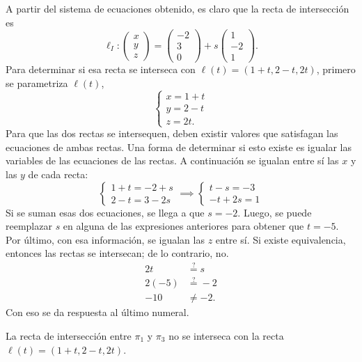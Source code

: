 \documentclass{fmbvecto}
\begin{document}
\begin{problema}
A partir del sistema de ecuaciones obtenido, es claro que la recta de intersección es
\[\ell_I\colon \begin{pmatrix}
    x\\y\\z
\end{pmatrix} = \begin{pmatrix}
    -2\\3\\0
\end{pmatrix} + s\begin{pmatrix}
    1\\-2\\1
\end{pmatrix}.\]
Para determinar si esa recta se interseca con \(\ell(t) = (1+t, 2-t, 2t)\), primero se parametriza \(\ell(t)\),
\[\begin{cases}
    x=1+t\\
    y=2-t\\
    z=2t.
\end{cases}\]
Para que las dos rectas se intersequen, deben existir valores que satisfagan las ecuaciones de ambas rectas. Una forma de determinar si esto existe es igualar las variables de las ecuaciones de las rectas. A continuación se igualan entre sí las \(x\) y las \(y\) de cada recta:
\[\begin{cases}
    1+t = -2+s\\
    2-t=3-2s
\end{cases} \implies \begin{cases}
    t-s=-3\\
    -t+2s=1
\end{cases} \]
Si se suman esas dos ecuaciones, se llega a que \(s=-2\). Luego, se puede reemplazar \(s\) en alguna de las expresiones anteriores para obtener que \(t=-5\). Por último, con esa información, se igualan las \(z\) entre sí. Si existe equivalencia, entonces las rectas se intersecan; de lo contrario, no.
\begin{align*}
    2t &\stackrel{?}{=} s\\
    2(-5) &\stackrel{?}{=} -2 \\
    -10 &\neq -2.
\end{align*}
Con eso se da respuesta al último numeral.
\begin{gbox}
    La recta de intersección entre \(\pi_1\) y \(\pi_3\) no se interseca con la recta \(\ell(t) = (1+t, 2-t, 2t)\).
\end{gbox}

\end{problema}
\end{document}
